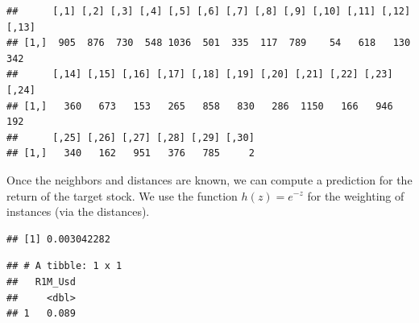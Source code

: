 \documentclass[]{krantz}
\makeatletter
\newenvironment{Shaded}{\begin{snugshade}}{\end{snugshade}}
\newcommand{\CommentTok}[1]{\textcolor[rgb]{0.37,0.37,0.37}{\textit{#1}}}
\newcommand{\DecValTok}[1]{\textcolor[rgb]{0.06,0.06,0.06}{#1}}
\newcommand{\KeywordTok}[1]{\textcolor[rgb]{0.27,0.27,0.27}{\textbf{#1}}}
\newcommand{\NormalTok}[1]{#1}
\newcommand{\OperatorTok}[1]{\textcolor[rgb]{0.43,0.43,0.43}{\textbf{#1}}}
\newcommand{\StringTok}[1]{\textcolor[rgb]{0.5,0.5,0.5}{#1}}
\newenvironment{kframe}{%
\medskip{}
\setlength{\fboxsep}{.8em}
 \def\at@end@of@kframe{}%
 \ifinner\ifhmode%
  \def\at@end@of@kframe{\end{minipage}}%
  \begin{minipage}{\columnwidth}%
 \fi\fi%
 \def\FrameCommand##1{\hskip\@totalleftmargin \hskip-\fboxsep
 \colorbox{shadecolor}{##1}\hskip-\fboxsep
     \hskip-\linewidth \hskip-\@totalleftmargin \hskip\columnwidth}%
 \MakeFramed {\advance\hsize-\width
   \@totalleftmargin\z@ \linewidth\hsize
   \@setminipage}}%
 {\par\unskip\endMakeFramed%
 \at@end@of@kframe}
\renewenvironment{Shaded}{\begin{kframe}}{\end{kframe}}
\theoremstyle{definition}
\theoremstyle{definition}
\theoremstyle{definition}
\theoremstyle{remark}
\makeatother
\begin{document}
\begin{verbatim}
##      [,1] [,2] [,3] [,4] [,5] [,6] [,7] [,8] [,9] [,10] [,11] [,12] [,13]
## [1,]  905  876  730  548 1036  501  335  117  789    54   618   130   342
##      [,14] [,15] [,16] [,17] [,18] [,19] [,20] [,21] [,22] [,23] [,24]
## [1,]   360   673   153   265   858   830   286  1150   166   946   192
##      [,25] [,26] [,27] [,28] [,29] [,30]
## [1,]   340   162   951   376   785     2
\end{verbatim}

\normalsize

Once the neighbors and distances are known, we can compute a prediction
for the return of the target stock. We use the function \(h(z)=e^{-z}\)
for the weighting of instances (via the distances).

\footnotesize

\begin{Shaded}
\end{Shaded}

\begin{verbatim}
## [1] 0.003042282
\end{verbatim}

\begin{Shaded}
\end{Shaded}

\begin{verbatim}
## # A tibble: 1 x 1
##   R1M_Usd
##     <dbl>
## 1   0.089
\end{verbatim}
\end{document}
